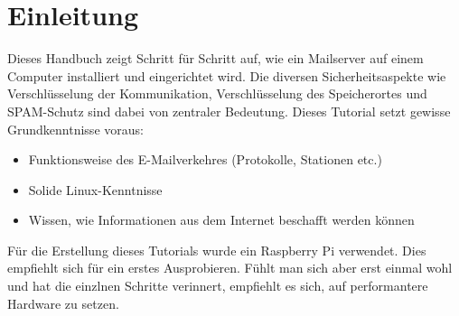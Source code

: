 \section{Einleitung}
Dieses Handbuch zeigt Schritt für Schritt auf, wie ein Mailserver auf einem Computer installiert und eingerichtet wird. Die diversen Sicherheitsaspekte wie Verschlüsselung der Kommunikation, Verschlüsselung des Speicherortes und SPAM-Schutz sind dabei von zentraler Bedeutung. Dieses Tutorial setzt gewisse Grundkenntnisse voraus:

\begin{itemize}
\item Funktionsweise des E-Mailverkehres (Protokolle, Stationen etc.)
\item Solide Linux-Kenntnisse
\item Wissen, wie Informationen aus dem Internet beschafft werden können
\end{itemize}

Für die Erstellung dieses Tutorials wurde ein Raspberry Pi verwendet. Dies empfiehlt sich für ein erstes Ausprobieren. Fühlt man sich aber erst einmal wohl und hat die einzlnen Schritte verinnert, empfiehlt es sich, auf performantere Hardware zu setzen.


